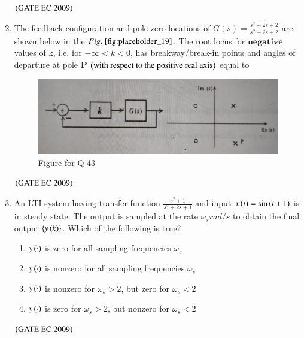 \documentclass[journal,12pt,onecolumn]{IEEEtran}
\theoremstyle{remark}
\begin{document}
\begin{enumerate}[start=1, label={Q\arabic*.}]
\begin{enumerate}
\begin{multicols}{2}
    \end{multicols}
\end{enumerate}
\hfill $\left(\text{GATE EC 2009}\right)$

\item The feedback configuration and pole-zero locations of $G(s) = \frac{s^2 -2s +2}{s^2 +2s +2}$ are shown below in the $\figref{fig:placeholder_19}$. The root locus for $\textbf{negative}$ values of k, i.e. for $-\infty < k<0$, has breakway/break-in points and angles of departure at pole $\textbf{P}$ $\left(\text{with respect to the positive real axis}\right)$ equal to 
\begin{figure}[H]
    \centering
    \includegraphics[width=0.5\columnwidth]{figs/img_19.jpg}
    \caption{Figure for Q-43}
    \label{fig:placeholder_19}
\end{figure}
\begin{enumerate}
\end{enumerate}
\hfill $\left(\text{GATE EC 2009}\right)$


\item An LTI system having transfer function $\frac{s^2+1}{s^2 +2s +1}$ and input $x\left(t\right) = \sin\left(t+1\right)$ is in steady state. The output is sampled at the rate $\omega_s rad/s$ to obtain the final output $\left\{ y\left(k\right)\right\}$. Which of the following is true?
\begin{enumerate}
        \item $y\left(\cdot\right)$ is zero for all sampling frequencies $\omega_s$
        \item $y\left(\cdot\right)$ is nonzero for all sampling frequencies $\omega_s$
        \item $y\left(\cdot\right)$ is nonzero for $\omega_s>2$, but zero for $\omega_s<2$
        \item $y\left(\cdot\right)$ is zero for $\omega_s>2$, but nonzero for $\omega_s<2$
\end{enumerate}
\hfill $\left(\text{GATE EC 2009}\right)$


\end{enumerate}
\end{document}
